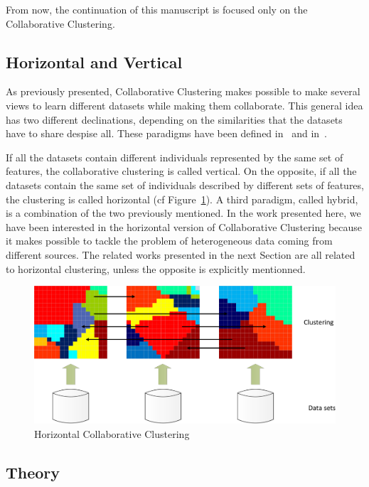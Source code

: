 \documentclass[a4paper]{report}
\begin{document}
    From now, the continuation of this manuscript is focused only on the Collaborative Clustering.

    \subsection{Horizontal and Vertical}

    As previously presented, Collaborative Clustering makes possible to make several views to learn different datasets while making them collaborate. This general idea has two different declinations, depending on the similarities that the datasets have to share despise all. These paradigms have been defined in~\cite{pedrycz2005knowledge} and in~\cite{grozavu2010topological}.

    If all the datasets contain different individuals represented by the same set of features, the collaborative clustering is called vertical. On the opposite, if all the datasets contain the same set of individuals described by different sets of features, the clustering is called horizontal (cf Figure~\ref{fig:hor_cc}). A third paradigm, called hybrid, is a combination of the two previously mentioned. In the work presented here, we have been interested in the horizontal version of Collaborative Clustering because it makes possible to tackle the problem of heterogeneous data coming from different sources. The related works presented in the next Section are all related to horizontal clustering, unless the opposite is explicitly mentionned.
    \vspace{.8cm}

        \begin{figure}[h]
            \centering
            \includegraphics[scale=0.2]{hcc}
            \caption{Horizontal Collaborative Clustering}
\label{fig:hor_cc}
        \end{figure}

    \subsection{Theory}
    
\end{document}
